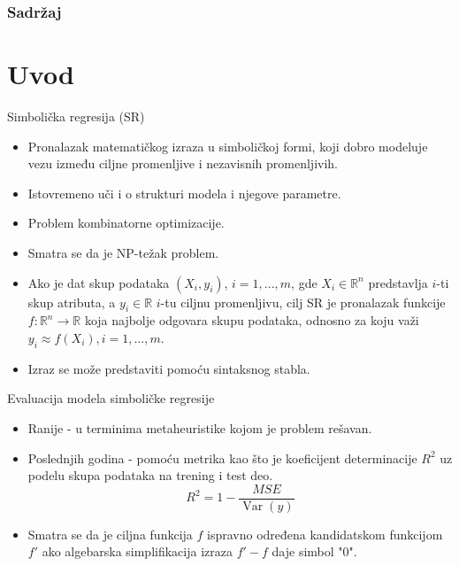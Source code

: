 \documentclass{beamer}
\begin{document}
\begin{frame}\frametitle{Sadržaj}\tableofcontents
\end{frame} 

\section{Uvod} 
\begin{frame} {Simbolička regresija (SR)} 
\begin{itemize}
\small
    \item Pronalazak matematičkog izraza u simboličkoj formi, koji dobro modeluje vezu između ciljne promenljive i nezavisnih promenljivih.
    \item Istovremeno uči i o strukturi modela i njegove parametre.
    \item Problem kombinatorne optimizacije.
    \item Smatra se da je NP-težak problem. %
    \item Ako je dat skup podataka $(X_i, y_i)$, $i=1,...,m$, gde $X_i \in \mathbb{R}^{n}$ predstavlja $i$-ti skup atributa, a $y_i \in \mathbb{R}$ $i$-tu ciljnu promenljivu, cilj SR je pronalazak funkcije $f: \mathbb{R}^{n} \rightarrow \mathbb{R}$ koja najbolje odgovara skupu podataka, odnosno za koju važi $y_i \approx f(X_i), i=1,...,m$.
    \item Izraz se može predstaviti pomoću sintaksnog stabla.
\end{itemize}

\end{frame}



\begin{frame}{Evaluacija modela simboličke regresije}
\begin{itemize}
\small
    \item Ranije - u terminima metaheuristike kojom je problem rešavan.
    \item Poslednjih godina - pomoću metrika kao što je koeficijent determinacije $R^2$ uz podelu skupa podataka na trening i test deo.
    \[ R^{2} = 1-\frac{MSE}{\operatorname{Var}(y)} \]
    \item Smatra se da je ciljna funkcija $f$ ispravno određena kandidatskom funkcijom $f'$ ako algebarska simplifikacija izraza $f' - f$ daje simbol "0".
\end{itemize}
\end{frame}
\end{document}
